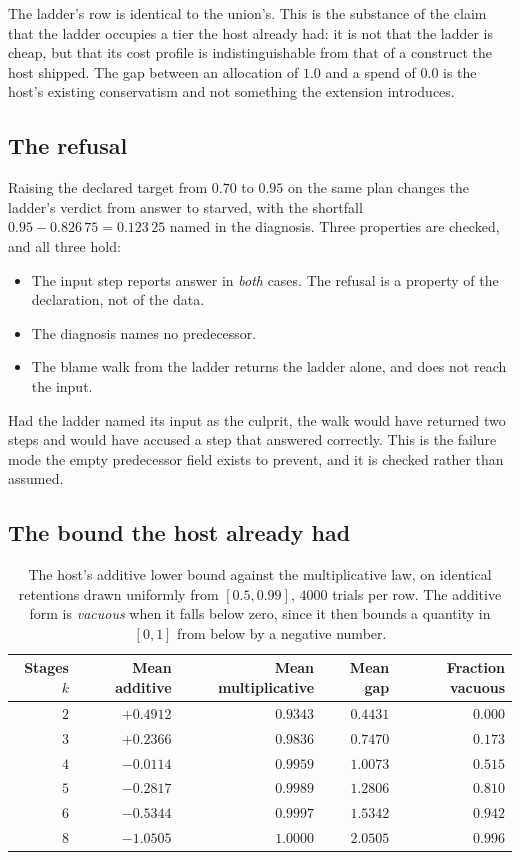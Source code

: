 \documentclass[11pt,twocolumn,a4paper]{article}
\theoremstyle{plain}
\theoremstyle{definition}
\theoremstyle{remark}
\newcommand{\vans}{\textsf{answer}}
\newcommand{\vstarve}{\textsf{starved}}
\begin{document}
The ladder's row is identical to the union's. This is the substance of the
claim that the ladder occupies a tier the host already had: it is not that the
ladder is cheap, but that its cost profile is indistinguishable from that of a
construct the host shipped. The gap between an allocation of $1.0$ and a spend
of $0.0$ is the host's existing conservatism and not something the extension
introduces.

\subsection{The refusal}

Raising the declared target from $0.70$ to $0.95$ on the same plan changes the
ladder's verdict from \vans{} to \vstarve{}, with the shortfall
$0.95-0.826\,75=0.123\,25$ named in the diagnosis. Three properties are
checked, and all three hold:

\begin{itemize}[leftmargin=1.6em,itemsep=0.25em]
\item The input step reports \vans{} in \emph{both} cases. The refusal is a
property of the declaration, not of the data.
\item The diagnosis names no predecessor.
\item The blame walk from the ladder returns the ladder alone, and does not
reach the input.
\end{itemize}

Had the ladder named its input as the culprit, the walk would have returned two
steps and would have accused a step that answered correctly. This is the
failure mode the empty predecessor field exists to prevent, and it is checked
rather than assumed.

\subsection{The bound the host already had}

\begin{table}[!htbp]
\centering
\caption{The host's additive lower bound against the multiplicative law, on
identical retentions drawn uniformly from $[0.5,0.99]$, $4000$ trials per row.
The additive form is \emph{vacuous} when it falls below zero, since it then
bounds a quantity in $[0,1]$ from below by a negative number.}
\label{tab:bound}
\begin{tabular}{rrrrr}
\toprule
Stages $k$ & Mean additive & Mean multiplicative & Mean gap & Fraction vacuous \\
\midrule
$2$ & $+0.4912$ & $0.9343$ & $0.4431$ & $0.000$ \\
$3$ & $+0.2366$ & $0.9836$ & $0.7470$ & $0.173$ \\
$4$ & $-0.0114$ & $0.9959$ & $1.0073$ & $0.515$ \\
$5$ & $-0.2817$ & $0.9989$ & $1.2806$ & $0.810$ \\
$6$ & $-0.5344$ & $0.9997$ & $1.5342$ & $0.942$ \\
$8$ & $-1.0505$ & $1.0000$ & $2.0505$ & $0.996$ \\
\bottomrule
\end{tabular}
\end{table}
\end{document}
